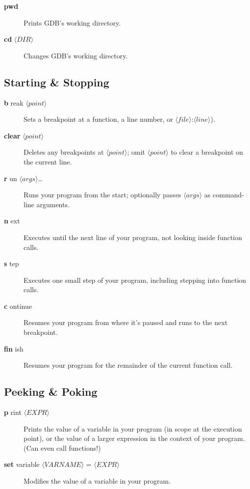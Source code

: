\documentclass[11pt]{article}
\newcommand\dbc[2]{{%
  \sffamily\upshape\mdseries
  \textbf{\textcolor{Abbreviation} {#1}}%
  #2}}
\newcommand\abw[1]{$\langle\mathit{#1}\rangle$}
\begin{document}
\begin{multicols}{2}
\begin{description}
  \item[\dbc{pwd}{}] Prints GDB’s working directory.

  \item[\dbc{cd}{} \abw{DIR}] Changes GDB’s working directory.
\end{description}

\subsection*{Starting \& Stopping}
\begin{description}

  \item[\dbc{b}{reak} \abw{point}] Sets a breakpoint at a function, a
    line number, or \abw{file}:\abw{line}).

  \item[\dbc{clear}{} \abw{point}] Deletes any breakpoints at
    \abw{point}; omit \abw{point} to clear a breakpoint on the current
    line.

  \item[\dbc{r}{un} \abw{args}\ldots] Runs your program from the start;
    optionally passes \abw{args} as command-line arguments.

  \item[\dbc{n}{ext}] Executes until the next line of your program, not
    looking inside function calls.

  \item[\dbc{s}{tep}] Executes one small step of your program, including
    stepping into function calls.

  \item[\dbc{c}{ontinue}] Resumes your program from where it’s paused
    and runs to the next breakpoint.

  \item[\dbc{fin}{ish}] Resumes your program for the remainder of the
    current function call.

\end{description}

\subsection*{Peeking \& Poking}
\begin{description}

  \item[\dbc{p}{rint} \abw{EXPR}] Prints the value of a variable in your
    program (in scope at the execution point), or the value of a larger
    expression in the context of your program. (Can even call
    functions!)

  \item[\dbc{set}{ variable} \abw{VARNAME} = \abw{EXPR}] Modifies the
    value of a variable in your program.

\end{description}

\end{multicols}
\end{document}
